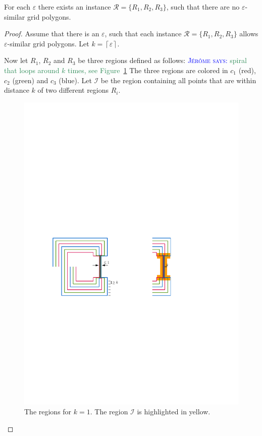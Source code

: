 \documentclass[a4paper,UKenglish,cleveref]{lipics-v2019}
\newcommand{\mremark}[3]{\textcolor{blue}{\textsc{#1 #2:}} \textcolor{SeaGreen}{\textsf{#3}}}
\newcommand{\jerome}[2][says]{\mremark{J\'er\^ome}{#1}{#2}}
\newcommand{\ixi}{\mathcal{I}}
\newcommand{\eps}{\varepsilon}
\begin{document}
\begin{theorem}\label{thm:unbouded}
For each $\eps$ there exists an instance $\mathcal{R}=\{R_1, R_2, R_3\}$, such that there are no $\eps$-similar grid polygons.
\end{theorem}
\begin{proof}
Assume that there is an $\eps$, such that each instance $\mathcal{R}=\{R_1, R_2, R_3\}$ allows $\eps$-similar grid polygons. Let $k=\left \lceil \eps \right \rceil$.

Now let $R_1$, $R_2$ and $R_3$ be three regions defined as follows:
\jerome{spiral that loops around $k$ times, see Figure~\ref{fig:arbitrary-spirals}}
The three regions are colored in $c_1$ (red), $c_2$ (green) and $c_3$ (blue).
Let $\ixi$ be the region containing all points that are within distance $k$ of two different regions $R_i$.

\begin{figure}
\centering
\includegraphics[scale=1]{Figures/arbitrary-lower-by-spirals.pdf}
\caption{The regions for $k=1$. The region $\ixi$ is highlighted in yellow.}
\label{fig:arbitrary-spirals}
\end{figure}


\end{proof}
\end{document}
